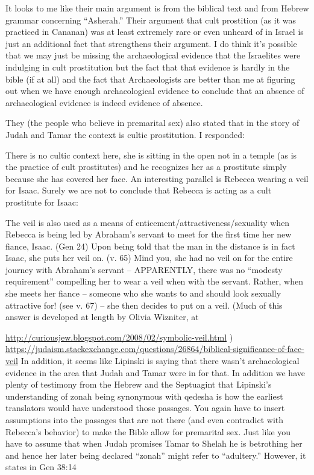 \documentclass[11pt]{article}
\begin{document}
{It looks to me like their main argument is from the biblical text and from Hebrew grammar concerning “Asherah.” Their argument that cult prostition (as it was practiced in Cananan) was at least extremely rare or even unheard of in Israel is just an additional fact that strengthens their argument. I do think it’s possible that we may just be missing the archaeological evidence that the Israelites were indulging in cult prostitution but the fact that that evidence is hardly in the bible (if at all) and the fact that Archaeologists are better than me at figuring out when we have enough archaeological evidence to conclude that an absence of archaeological evidence is indeed evidence of absence.

They (the people who believe in premarital sex) also stated that in the story of Judah and Tamar the context is cultic prostitution. I responded:

There is no cultic context here, she is sitting in the open not in a temple (as is the practice of cult prostitutes) and he recognizes her as a prostitute simply because she has covered her face. An interesting parallel is Rebecca wearing a veil for Isaac. Surely we are not to conclude that Rebecca is acting as a cult prostitute for Isaac:

The veil is also used as a means of enticement/attractiveness/sexuality when Rebecca is being led by Abraham’s servant to meet for the first time her new fiance, Isaac. (Gen 24) Upon being told that the man in the distance is in fact Isaac, she puts her veil on. (v. 65) Mind you, she had no veil on for the entire journey with Abraham’s servant – APPARENTLY, there was no “modesty requirement” compelling her to wear a veil when with the servant. Rather, when she meets her fiance – someone who she wants to and should look sexually attractive for! (see v. 67) – she then decides to put on a veil.
(Much of this answer is developed at length by Olivia Wizniter, at

\url{http://curiousjew.blogspot.com/2008/02/symbolic-veil.html} ) \newline
\url{https://judaism.stackexchange.com/questions/26864/biblical-significance-of-face-veil}
In addition, it seems like Lipinski is saying that there wasn’t archaeological evidence in the area that Judah and Tamar were in for that. In addition we have plenty of testimony from the Hebrew and the Septuagint that Lipinski’s understanding of zonah being synonymous with qedesha is how the earliest translators would have understood those passages. You again have to insert assumptions into the passages that are not there (and even contradict with Rebecca’s behavior) to make the Bible allow for premarital sex. Just like you have to assume that when Judah promises Tamar to Shelah he is betrothing her and hence her later being declared “zonah” might refer to “adultery.” However, it states in Gen 38:14

}
\end{document}
